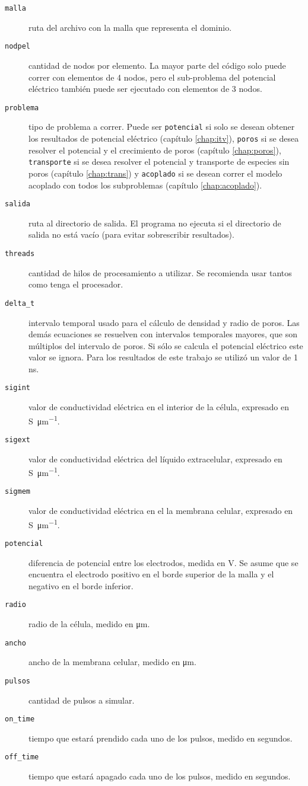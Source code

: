 \begin{description}
	\item[\texttt{malla}] ruta del archivo con la malla que representa el dominio. 
	\item[\texttt{nodpel}] cantidad de nodos por elemento. La mayor parte del código solo puede correr con elementos de 4 nodos, pero el sub-problema del potencial eléctrico también puede ser ejecutado con elementos de 3 nodos.
	\item[\texttt{problema}] tipo de problema a correr. Puede ser \texttt{potencial} si solo se desean obtener los resultados de potencial eléctrico (capítulo \ref{chap:itv}), \texttt{poros} si se desea resolver el potencial y el crecimiento de poros (capítulo \ref{chap:poros}), \texttt{transporte} si se desea resolver el potencial y transporte de especies sin poros (capítulo \ref{chap:trans}) y \texttt{acoplado} si se desean correr el modelo acoplado con todos los subproblemas (capítulo \ref{chap:acoplado}).
	\item[\texttt{salida}] ruta al directorio de salida. El programa no ejecuta si el directorio de salida no está vacío (para evitar sobrescribir resultados).
	\item[\texttt{threads}] cantidad de hilos de procesamiento a utilizar. Se recomienda usar tantos como tenga el procesador.
	\item[\texttt{delta\_t}] intervalo temporal usado para el cálculo de densidad y radio de poros. Las demás ecuaciones se resuelven con intervalos temporales mayores, que son múltiplos del intervalo de poros. Si sólo se calcula el potencial eléctrico este valor se ignora. Para los resultados de este trabajo se utilizó un valor de 1 \si{\nano\second}.
	\item[\texttt{sigint}] valor de conductividad eléctrica en el interior de la célula, expresado en \si{\siemens \per \micro\metre}.
	\item[\texttt{sigext}] valor de conductividad eléctrica del líquido extracelular, expresado en \si{\siemens \per \micro\metre}.
	\item[\texttt{sigmem}] valor de conductividad eléctrica en el la membrana celular, expresado en \si{\siemens \per \micro\metre}.
	\item[\texttt{potencial}] diferencia de potencial entre los electrodos, medida en \si{\volt}. Se asume que se encuentra el electrodo positivo en el borde superior de la malla y el negativo en el borde inferior.
	\item[\texttt{radio}] radio de la célula, medido en \si{\micro\metre}.
	\item[\texttt{ancho}] ancho de la membrana celular, medido en \si{\micro\metre}.
	\item[\texttt{pulsos}] cantidad de pulsos a simular.
	\item[\texttt{on\_time}] tiempo que estará prendido cada uno de los pulsos, medido en segundos.
	\item[\texttt{off\_time}] tiempo que estará apagado cada uno de los pulsos, medido en segundos. 
\end{description}

